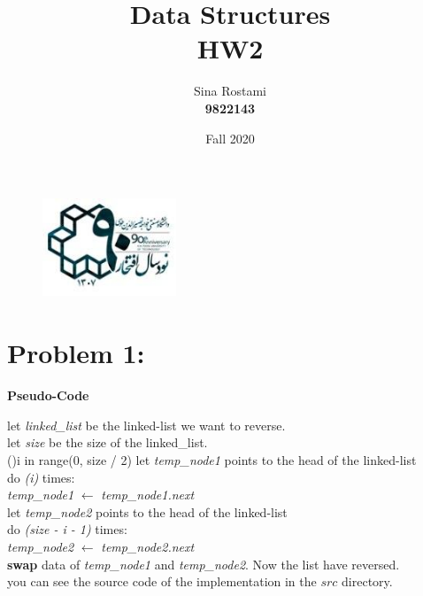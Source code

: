 \documentclass{report}
\title{\Huge Data Structures \\ HW2}
\author{\huge Sina Rostami \\\huge \textbf{9822143}}
\date{Fall 2020}
\newcommand\tab[1][1cm]{\hspace*{#1}}
\begin{document}
    \begin{figure}
        \includegraphics[height = 30mm,width = 40mm]{../kntu_logo.jpg}
    \end{figure}
    \maketitle
    \section*{Problem 1:}
        \textbf{Pseudo-Code}
        \begin{algorithm}
            let \textit{linked\_list} be the linked-list we want to reverse.\\
            let \textit{size} be the size of the linked\_list.\\
            \For(){i in range(0, size / 2) }{
                let \textit{temp\_node1} points to the head of the linked-list\\
                do \textit{(i)} times:\\
                \tab \textit{temp\_node1} $\gets$ \textit{temp\_node1.next}\\
                let \textit{temp\_node2} points to the head of the linked-list\\
                do \textit{(size - i - 1)} times:\\
                \tab \textit{temp\_node2} $\gets$ \textit{temp\_node2.next}\\
                \textbf{swap} data of \textit{temp\_node1} and \textit{temp\_node2}.
            }
            Now the list have reversed.\\
            you can see the source code of the implementation in the $src$ directory.\\
        \end{algorithm}
\end{document}
